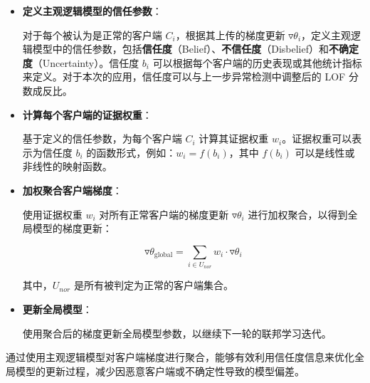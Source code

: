 \documentclass[lettersize,journal]{IEEEtran}
\begin{document}
\begin{enumerate}
\begin{itemize}
    \item \textbf{定义主观逻辑模型的信任参数}：

    对于每个被认为是正常的客户端 \( C_i \)，根据其上传的梯度更新 \( \triangledown \theta_i \)，定义主观逻辑模型中的信任参数，包括\textbf{信任度}（Belief）、\textbf{不信任度}（Disbelief）和\textbf{不确定度}（Uncertainty）。信任度 \( b_i \) 可以根据每个客户端的历史表现或其他统计指标来定义。对于本次的应用，信任度可以与上一步异常检测中调整后的 LOF 分数成反比。

    \item \textbf{计算每个客户端的证据权重}：

    基于定义的信任参数，为每个客户端 \( C_i \) 计算其证据权重 \( w_i \)。证据权重可以表示为信任度 \( b_i \) 的函数形式，例如：\( w_i = f(b_i) \)，其中 \( f(b_i) \) 可以是线性或非线性的映射函数。

    \item \textbf{加权聚合客户端梯度}：

    使用证据权重 \( w_i \) 对所有正常客户端的梯度更新 \( \triangledown \theta_i \) 进行加权聚合，以得到全局模型的梯度更新：

    \begin{equation}
    \triangledown \theta_{\text{global}} = \sum_{i \in U_{nor}} w_i \cdot \triangledown \theta_i
    \end{equation}

    其中，\( U_{nor} \) 是所有被判定为正常的客户端集合。

    \item \textbf{更新全局模型}：

    使用聚合后的梯度更新全局模型参数，以继续下一轮的联邦学习迭代。
\end{itemize}

通过使用主观逻辑模型对客户端梯度进行聚合，能够有效利用信任度信息来优化全局模型的更新过程，减少因恶意客户端或不确定性导致的模型偏差。

\end{enumerate}


\end{document}
